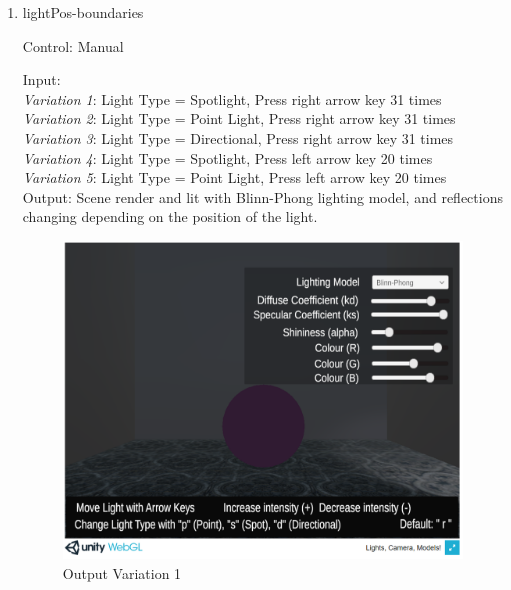 \documentclass[12pt, titlepage]{article}
\begin{document}
\begin{enumerate}
	

	\item{lightPos-boundaries\\}
	
	Control: Manual
	
	Input:  \\
	\textit{Variation 1}: Light Type = Spotlight, Press right arrow key 31 
	times\\
	\textit{Variation 2}: Light Type = Point Light, Press right arrow key 31 
	times\\
	\textit{Variation 3}: Light Type = Directional, Press right arrow key 31 
	times\\
	\textit{Variation 4}: Light Type = Spotlight, Press left arrow key 20 
	times\\
	\textit{Variation 5}: Light Type = Point Light, Press left arrow key 20 
	times\\
	
	Output: Scene render and lit with Blinn-Phong lighting model, and 
	reflections changing depending on the position of the light.
	
	\begin{figure}[h]
		\centering
		\includegraphics[scale=0.25]{./images/fromVnVPlan/sphere-lit-spotlight-moveBoundsR}
		\caption{Output Variation 1}
		\label{fig:spotlight-bounds-right}
	\end{figure}	
	

\end{enumerate}
\end{document}
